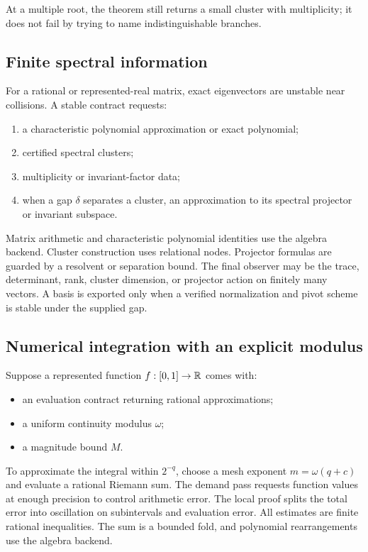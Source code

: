 At a multiple root, the theorem still returns a small cluster with multiplicity;
it does not fail by trying to name indistinguishable branches.

\subsection{Finite spectral information}

For a rational or represented-real matrix, exact eigenvectors are unstable near
collisions.  A stable contract requests:

\begin{enumerate}
\item a characteristic polynomial approximation or exact polynomial;
\item certified spectral clusters;
\item multiplicity or invariant-factor data;
\item when a gap \(\delta\) separates a cluster, an approximation to its
spectral projector or invariant subspace.
\end{enumerate}

Matrix arithmetic and characteristic polynomial identities use the algebra
backend.  Cluster construction uses relational nodes.  Projector formulas are
guarded by a resolvent or separation bound.  The final observer may be the
trace, determinant, rank, cluster dimension, or projector action on finitely
many vectors.  A basis is exported only when a verified normalization and pivot
scheme is stable under the supplied gap.

\subsection{Numerical integration with an explicit modulus}

Suppose a represented function \(f:[0,1]\to\mathbb R\) comes with:

\begin{itemize}
\item an evaluation contract returning rational approximations;
\item a uniform continuity modulus \(\omega\);
\item a magnitude bound \(M\).
\end{itemize}

To approximate the integral within \(2^{-q}\), choose a mesh exponent
\(m=\omega(q+c)\) and evaluate a rational Riemann sum.  The demand pass requests
function values at enough precision to control arithmetic error.  The local
proof splits the total error into oscillation on subintervals and evaluation
error.  All estimates are finite rational inequalities.  The sum is a bounded
fold, and polynomial rearrangements use the algebra backend.

